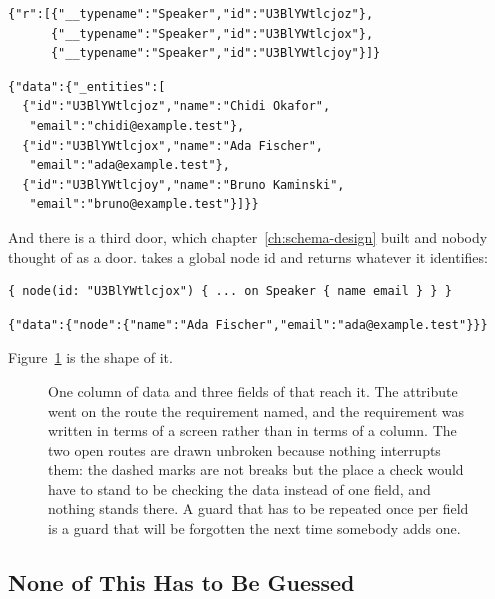 \begin{verbatim}
{"r":[{"__typename":"Speaker","id":"U3BlYWtlcjoz"},
      {"__typename":"Speaker","id":"U3BlYWtlcjox"},
      {"__typename":"Speaker","id":"U3BlYWtlcjoy"}]}
\end{verbatim}

\begin{verbatim}
{"data":{"_entities":[
  {"id":"U3BlYWtlcjoz","name":"Chidi Okafor",
   "email":"chidi@example.test"},
  {"id":"U3BlYWtlcjox","name":"Ada Fischer",
   "email":"ada@example.test"},
  {"id":"U3BlYWtlcjoy","name":"Bruno Kaminski",
   "email":"bruno@example.test"}]}}
\end{verbatim}

%
And there is a third door, which chapter~\ref{ch:schema-design} built and
nobody thought of as a door.  takes a global node id and
returns whatever it identifies:

\begin{verbatim}
{ node(id: "U3BlYWtlcjox") { ... on Speaker { name email } } }
\end{verbatim}

\begin{verbatim}
{"data":{"node":{"name":"Ada Fischer","email":"ada@example.test"}}}
\end{verbatim}

Figure~\ref{fig:ch12-three-doors} is the shape of it.

\begin{figure}[htbp]
  \centering
  
  \caption{One column of data and three fields of  that reach it.
  The attribute went on the route the requirement named, and the requirement
  was written in terms of a screen rather than in terms of a column. The two
  open routes are drawn unbroken because nothing interrupts them: the dashed
  marks are not breaks but the place a check would have to stand to be
  checking the data instead of one field, and nothing stands there. A guard
  that has to be repeated once per field is a guard that will be forgotten
  the next time somebody adds one.}
  \label{fig:ch12-three-doors}
\end{figure}

\subsection{None of This Has to Be Guessed}

